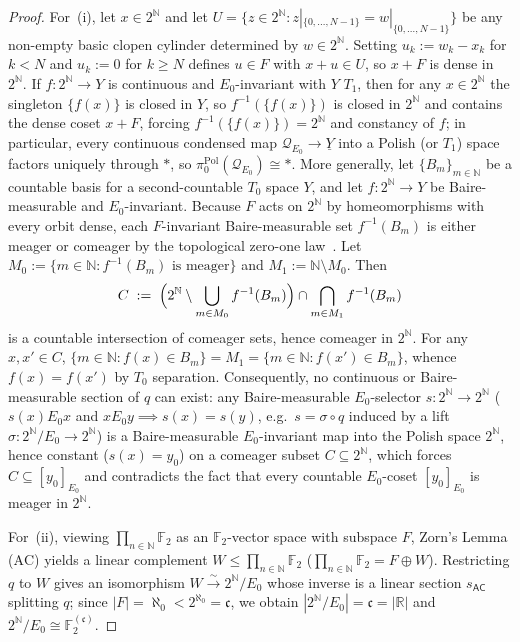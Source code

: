 \documentclass[10pt,twoside,openright]{book}
\theoremstyle{crmplain}
\theoremstyle{crmdef}
\theoremstyle{crmremark}
\begin{document}
\begin{proof}
For~(i), let $x \in 2^{\mathbb{N}}$ and let $U = \{z \in 2^{\mathbb{N}} : z|_{\{0,\dots,N-1\}} = w|_{\{0,\dots,N-1\}}\}$ be any non-empty basic clopen cylinder determined by $w \in 2^{\mathbb{N}}$. Setting $u_k := w_k - x_k$ for $k < N$ and $u_k := 0$ for $k \ge N$ defines $u \in F$ with $x + u \in U$, so $x + F$ is dense in $2^{\mathbb{N}}$. If $f : 2^{\mathbb{N}} \to Y$ is continuous and $E_0$-invariant with $Y$ $T_1$, then for any $x \in 2^{\mathbb{N}}$ the singleton $\{f(x)\}$ is closed in $Y$, so $f^{-1}(\{f(x)\})$ is closed in $2^{\mathbb{N}}$ and contains the dense coset $x + F$, forcing $f^{-1}(\{f(x)\}) = 2^{\mathbb{N}}$ and constancy of $f$; in particular, every continuous condensed map $\mathcal{Q}_{E_0} \to \underline{Y}$ into a Polish (or $T_1$) space factors uniquely through $*$, so $\pi_0^{\mathrm{Pol}}(\mathcal{Q}_{E_0}) \cong *$. More generally, let $\{B_m\}_{m \in \mathbb{N}}$ be a countable basis for a second-countable $T_0$ space $Y$, and let $f : 2^{\mathbb{N}} \to Y$ be Baire-measurable and $E_0$-invariant. Because $F$ acts on $2^{\mathbb{N}}$ by homeomorphisms with every orbit dense, each $F$-invariant Baire-measurable set $f^{-1}(B_m)$ is either meager or comeager by the topological zero-one law~\cite[Theorem~8.46]{Kechris95}. Let $M_0 := \{m \in \mathbb{N} : f^{-1}(B_m) \text{ is meager}\}$ and $M_1 := \mathbb{N} \setminus M_0$. Then
\[
  C \;:=\; \Bigl(2^{\mathbb{N}} \setminus \bigcup_{m \in M_0} f^{-1}(B_m)\Bigr) \cap \bigcap_{m \in M_1} f^{-1}(B_m)
\]
is a countable intersection of comeager sets, hence comeager in $2^{\mathbb{N}}$. For any $x, x' \in C$, $\{m \in \mathbb{N} : f(x) \in B_m\} = M_1 = \{m \in \mathbb{N} : f(x') \in B_m\}$, whence $f(x) = f(x')$ by $T_0$ separation. Consequently, no continuous or Baire-measurable section of $q$ can exist: any Baire-measurable $E_0$-selector $s : 2^{\mathbb{N}} \to 2^{\mathbb{N}}$ ($s(x) \mathrel{E_0} x$ and $x \mathrel{E_0} y \implies s(x) = s(y)$, e.g.\ $s = \sigma \circ q$ induced by a lift $\sigma : 2^{\mathbb{N}}/E_0 \to 2^{\mathbb{N}}$) is a Baire-measurable $E_0$-invariant map into the Polish space $2^{\mathbb{N}}$, hence constant ($s(x) = y_0$) on a comeager subset $C \subseteq 2^{\mathbb{N}}$, which forces $C \subseteq [y_0]_{E_0}$ and contradicts the fact that every countable $E_0$-coset $[y_0]_{E_0}$ is meager in $2^{\mathbb{N}}$.

For~(ii), viewing $\prod_{n \in \mathbb{N}} \mathbb{F}_2$ as an $\mathbb{F}_2$-vector space with subspace $F$, Zorn's Lemma ($\mathrm{AC}$) yields a linear complement $W \le \prod_{n \in \mathbb{N}} \mathbb{F}_2$ ($\prod_{n \in \mathbb{N}} \mathbb{F}_2 = F \oplus W$). Restricting $q$ to $W$ gives an isomorphism $W \xrightarrow{\sim} 2^{\mathbb{N}}/E_0$ whose inverse is a linear section $s_{\mathsf{AC}}$ splitting $q$; since $|F| = \aleph_0 < 2^{\aleph_0} = \mathfrak{c}$, we obtain $|2^{\mathbb{N}}/E_0| = \mathfrak{c} = |\mathbb{R}|$ and $2^{\mathbb{N}}/E_0 \cong \mathbb{F}_2^{(\mathfrak{c})}$.


\end{proof}
\end{document}
